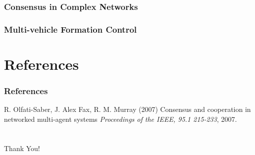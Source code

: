 \documentclass{beamer}
\begin{document}
\begin{frame}
\frametitle{Consensus in Complex Networks}


\end{frame}


\begin{frame}
\frametitle{Multi-vehicle Formation Control}


\end{frame}

\section{References}

\begin{frame}
\frametitle{References}
\footnotesize{
\begin{thebibliography}{99} %

 R. Olfati-Saber, J. Alex Fax, R. M. Murray (2007)
\newblock Consensus and cooperation in networked multi-agent systems
\newblock \emph{Proceedings of the IEEE, 95.1 215-233}, 2007.

\end{thebibliography}
}
\end{frame}

\section{}
\begin{frame}
\begin{center}
\Huge {Thank You!}
\end{center}
\end{frame}

\end{document}

